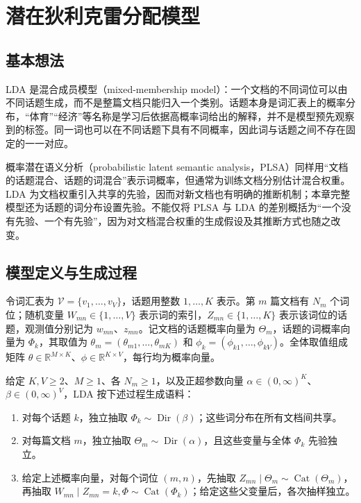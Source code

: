 \section{潜在狄利克雷分配模型}
\label{sec:lh-lda-model}

\subsection{基本想法}
\label{subsec:lh-lda-model-idea}

LDA 是混合成员模型（mixed-membership model）：一个文档的不同词位可以由不同话题生成，而不是整篇文档只能归入一个类别。话题本身是词汇表上的概率分布，“体育”“经济”等名称是学习后依据高概率词给出的解释，并不是模型预先观察到的标签。同一词也可以在不同话题下具有不同概率，因此词与话题之间不存在固定的一一对应。

概率潜在语义分析（probabilistic latent semantic analysis，PLSA）同样用“文档的话题混合、话题的词混合”表示词概率，但通常为训练文档分别估计混合权重。LDA 为文档权重引入共享的先验，因而对新文档也有明确的推断机制；本章完整模型还为话题的词分布设置先验。不能仅将 PLSA 与 LDA 的差别概括为“一个没有先验、一个有先验”，因为对文档混合权重的生成假设及其推断方式也随之改变。

\subsection{模型定义与生成过程}
\label{subsec:lh-lda-model-definition}

令词汇表为 $\mathcal V=\{v_1,\ldots,v_V\}$，话题用整数 $1,\ldots,K$ 表示。第 $m$ 篇文档有 $N_m$ 个词位；随机变量 $W_{mn}\in\{1,\ldots,V\}$ 表示词的索引，$Z_{mn}\in\{1,\ldots,K\}$ 表示该词位的话题，观测值分别记为 $w_{mn}$、$z_{mn}$。记文档的话题概率向量为 $\Theta_m$，话题的词概率向量为 $\Phi_k$，其取值为 $\theta_m=(\theta_{m1},\ldots,\theta_{mK})$ 和 $\phi_k=(\phi_{k1},\ldots,\phi_{kV})$。全体取值组成矩阵 $\theta\in\mathbb R^{M\times K}$、$\phi\in\mathbb R^{K\times V}$，每行均为概率向量。

\begin{definition}[完整 LDA 模型]
\label{def:lh-lda-model}
给定 $K,V\geq2$、$M\geq1$、各 $N_m\geq1$，以及正超参数向量 $\alpha\in(0,\infty)^K$、$\beta\in(0,\infty)^V$，LDA 按下述过程生成语料：
\begin{enumerate}
\item 对每个话题 $k$，独立抽取 $\Phi_k\sim\operatorname{Dir}(\beta)$；这些词分布在所有文档间共享。
\item 对每篇文档 $m$，独立抽取 $\Theta_m\sim\operatorname{Dir}(\alpha)$，且这些变量与全体 $\Phi_k$ 先验独立。
\item 给定上述概率向量，对每个词位 $(m,n)$，先抽取 $Z_{mn}\mid\Theta_m\sim\operatorname{Cat}(\Theta_m)$，再抽取 $W_{mn}\mid Z_{mn}=k,\Phi\sim\operatorname{Cat}(\Phi_k)$；给定这些父变量后，各次抽样独立。
\end{enumerate}
\end{definition}

